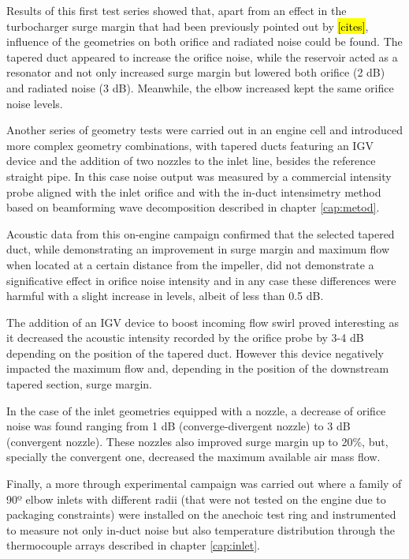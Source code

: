 Results of this first test series showed that, apart from an effect in the turbocharger surge margin that had been previously pointed out by \hl{[cites]}, influence of the geometries on both orifice and radiated noise could be found. The tapered duct appeared to increase the orifice noise, while the reservoir acted as a resonator and not only increased surge margin but lowered both orifice (2 dB) and radiated noise (3 dB). Meanwhile, the elbow increased kept the same orifice noise levels.

Another series of geometry tests were carried out in an engine cell and introduced more complex geometry combinations, with tapered ducts featuring an IGV device and the addition of two nozzles to the inlet line, besides the reference straight pipe. In this case noise output was measured by a commercial intensity probe aligned with the inlet orifice and with the in-duct intensimetry method based on beamforming wave decomposition described in chapter \ref{cap:metod}.

Acoustic data from this on-engine campaign confirmed that the selected tapered duct, while demonstrating an improvement in surge margin and maximum flow when located at a certain distance from the impeller, did not demonstrate a significative effect in orifice noise intensity and in any case these differences were harmful with a slight increase in levels, albeit of less than 0.5 dB.

The addition of an IGV device to boost incoming flow swirl proved interesting as it decreased the acoustic intensity recorded by the orifice probe by 3-4 dB depending on the position of the tapered duct. However this device negatively impacted the maximum flow and, depending in the position of the downstream tapered section, surge margin. 

In the case of the inlet geometries equipped with a nozzle, a decrease of orifice noise was found ranging from 1 dB (converge-divergent nozzle) to 3 dB (convergent nozzle). These nozzles also improved surge margin up to 20\%, but, specially the convergent one, decreased the maximum available air mass flow.

Finally, a more through experimental campaign was carried out where a family of 90º elbow inlets with different radii (that were not tested on the engine due to packaging constraints) were installed on the anechoic test ring and instrumented to measure not only in-duct noise but also temperature distribution through the thermocouple arrays described in chapter \ref{cap:inlet}.

